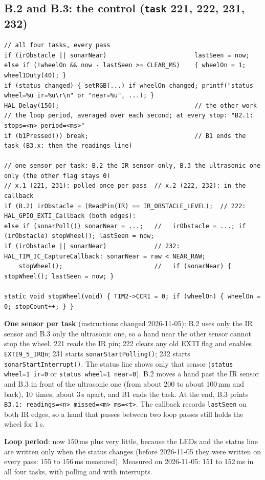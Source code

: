 \documentclass[11pt,a4paper]{article}
\newcommand{\lv}[1]{\texttt{#1}}                 %
\begin{document}
\subsection*{B.2 and B.3: the control (\lv{task} 221, 222, 231, 232)}
\begin{lstlisting}
// all four tasks, every pass
if (irObstacle || sonarNear)                        lastSeen = now;
else if (!wheelOn && now - lastSeen >= CLEAR_MS)    { wheelOn = 1; wheel1Duty(40); }
if (status changed) { setRGB(...) if wheelOn changed; printf("status wheel=%u ir=%u\r\n" or "near=%u", ...); }
HAL_Delay(150);                                     // the other work
// the loop period, averaged over each second; at every stop: "B2.1: stops=<n> period=<ms>"
if (b1Pressed()) break;                             // B1 ends the task (B3.x: then the readings line)

// one sensor per task: B.2 the IR sensor only, B.3 the ultrasonic one only (the other flag stays 0)
// x.1 (221, 231): polled once per pass  // x.2 (222, 232): in the callback
if (B.2) irObstacle = (ReadPin(IR) == IR_OBSTACLE_LEVEL);  // 222: HAL_GPIO_EXTI_Callback (both edges):
else if (sonarPoll()) sonarNear = ...;   //   irObstacle = ...; if (irObstacle) stopWheel(); lastSeen = now;
if (irObstacle || sonarNear)             // 232: HAL_TIM_IC_CaptureCallback: sonarNear = raw < NEAR_RAW;
    stopWheel();                         //   if (sonarNear) { stopWheel(); lastSeen = now; }

static void stopWheel(void) { TIM2->CCR1 = 0; if (wheelOn) { wheelOn = 0; stopCount++; } }
\end{lstlisting}
\textbf{One sensor per task} (instructions changed 2026-11-05): B.2 uses only the IR sensor and B.3 only the
ultrasonic one, so a hand near the other sensor cannot stop the wheel. 221 reads the IR pin; 222 clears any old
EXTI flag and enables \texttt{EXTI9\_5\_IRQn}; 231 starts \texttt{sonarStartPolling()}; 232 starts
\texttt{sonarStartInterrupt()}. The status line shows only that sensor (\texttt{status wheel=1 ir=0} or
\texttt{status wheel=1 near=0}). B.2 moves a hand past the IR sensor and B.3 in front of the
ultrasonic one (from about 200 to about 100\,mm and back), 10 times, about 3\,s apart, and B1 ends the task. At the
end, B.3 prints \texttt{B3.1: readings=<n> missed=<m> ms=<t>}. The callback records \texttt{lastSeen} on both IR
edges, so a hand that passes between two loop passes still holds the wheel for 1\,s.

\textbf{Loop period}: now $150\,\mathrm{ms}$ plus very little, because the LEDs and the status line are written only
when the status changes (before 2026-11-05 they were written on every pass: 155 to 156\,ms measured). Measured on 2026-11-05: 151 to
152\,ms in all four tasks, with polling and with interrupts.
\end{document}
